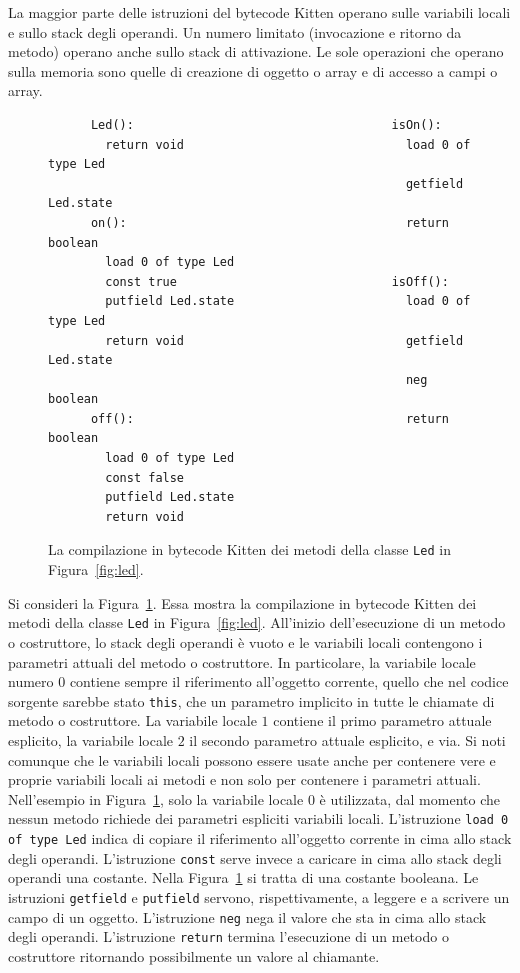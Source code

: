 La maggior parte delle istruzioni del bytecode Kitten operano sulle
variabili locali e sullo stack degli operandi. Un numero limitato
(invocazione e ritorno da metodo) operano anche sullo stack di attivazione.
Le sole operazioni che operano sulla memoria sono quelle
di creazione di oggetto o array e di accesso a campi o array.
%
\begin{figure}[t]
\begin{verbatim}
      Led():                                    isOn():
        return void                               load 0 of type Led
                                                  getfield Led.state
      on():                                       return boolean
        load 0 of type Led
        const true                              isOff():
        putfield Led.state                        load 0 of type Led
        return void                               getfield Led.state
                                                  neg boolean
      off():                                      return boolean
        load 0 of type Led
        const false
        putfield Led.state
        return void
\end{verbatim}
\caption{La compilazione in bytecode Kitten dei metodi della classe \texttt{Led} in Figura~\ref{fig:led}.}\label{fig:led_bytecode}
\end{figure}

Si consideri la Figura~\ref{fig:led_bytecode}. Essa mostra la compilazione
in bytecode Kitten dei metodi della classe \texttt{Led} in
Figura~\ref{fig:led}. All'inizio dell'esecuzione di un metodo o costruttore,
lo stack degli operandi \`e vuoto e le variabili locali contengono i
parametri attuali del metodo o costruttore. In particolare, la variabile
locale numero $0$ contiene sempre il riferimento all'oggetto corrente,
\cioe quello che nel codice sorgente sarebbe stato \texttt{this}, che \e
un parametro implicito in tutte le chiamate di metodo o costruttore. La
variabile locale $1$ contiene il primo parametro attuale esplicito,
la variabile locale $2$ il secondo parametro attuale esplicito, e \cosi via.
Si noti comunque che le variabili locali possono essere usate anche per
contenere vere e proprie variabili locali ai metodi e non solo per contenere
i parametri attuali. Nell'esempio
in Figura~\ref{fig:led_bytecode}, solo la variabile locale $0$ \`e utilizzata,
dal momento che nessun metodo richiede dei parametri espliciti \nec
variabili locali.
L'istruzione \texttt{load 0 of type Led}
indica di copiare il riferimento all'oggetto corrente in cima allo
stack degli operandi. L'istruzione \texttt{const} serve invece a caricare
in cima allo stack degli operandi una costante. Nella
Figura~\ref{fig:led_bytecode} si tratta di una costante booleana.
Le istruzioni \texttt{getfield} e \texttt{putfield} servono, rispettivamente,
a leggere e a scrivere un campo di un oggetto. L'istruzione \texttt{neg}
nega il valore che sta in cima allo stack degli operandi. L'istruzione
\texttt{return} termina l'esecuzione di un metodo o costruttore ritornando
possibilmente un valore al chiamante.

